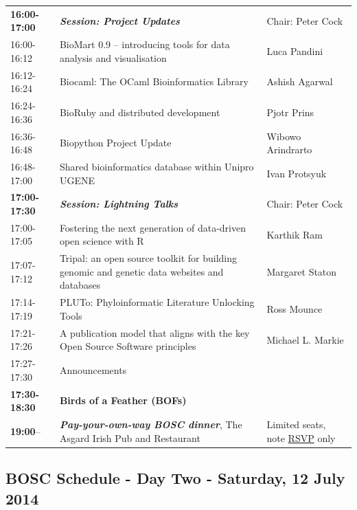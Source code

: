 \documentclass[10pt,oneside]{article}
\begin{document}
\begin{center}
\begin{tabular}{|p{2.0cm}|p{10cm}|p{3.3cm}|}
\hline
\textbf{16:00-17:00} & \textbf{\textit{Session: Project Updates}} & Chair: Peter Cock\\
16:00-16:12 & BioMart 0.9 -- introducing tools for data analysis and visualisation & Luca Pandini\\
16:12-16:24 & Biocaml: The OCaml Bioinformatics Library & Ashish Agarwal\\
16:24-16:36 & BioRuby and distributed development & Pjotr Prins\\
16:36-16:48 & Biopython Project Update & Wibowo Arindrarto\\
16:48-17:00 & Shared bioinformatics database within Unipro UGENE & Ivan Protsyuk\\
\hline
\textbf{17:00-17:30} & \textbf{\textit{Session: Lightning Talks}} & Chair: Peter Cock\\
17:00-17:05 & Fostering the next generation of data-driven open science with R & Karthik Ram\\
17:07-17:12 & Tripal: an open source toolkit for building genomic and genetic data websites and databases & Margaret Staton\\
17:14-17:19 & PLUTo: Phyloinformatic Literature Unlocking Tools & Ross Mounce\\
17:21-17:26 & A publication model that aligns with the key Open Source Software principles & Michael L. Markie\\
17:27-17:30 & Announcements & \\
\hline
\textbf{17:30-18:30} & \textbf{Birds of a Feather (BOFs)} & \\
\hline
\textbf{19:00}-- & \textbf{\textit{Pay-your-own-way BOSC dinner}}, The Asgard Irish Pub and Restaurant & Limited seats, note \href{http://bit.ly/BOSC2014-dinner}{RSVP} only \\
\hline
\end{tabular}
\end{center}

\newpage

\subsection*{BOSC Schedule - Day Two - Saturday, 12 July 2014}
\end{document}
